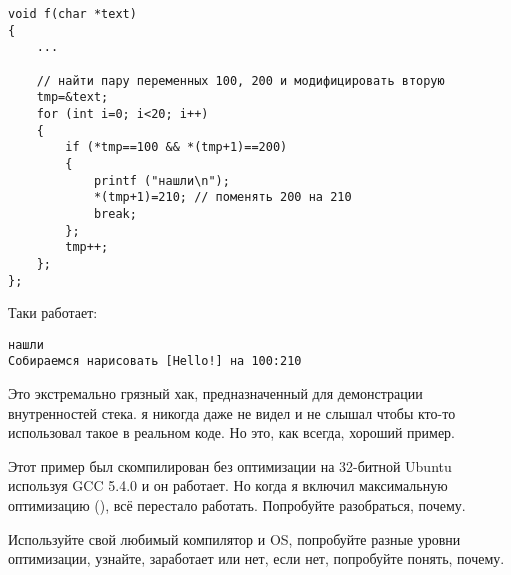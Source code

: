\begin{lstlisting}[style=customc]
void f(char *text)
{
	...

	// найти пару переменных 100, 200 и модифицировать вторую
	tmp=&text;
	for (int i=0; i<20; i++)
	{
		if (*tmp==100 && *(tmp+1)==200)
		{
			printf ("нашли\n");
			*(tmp+1)=210; // поменять 200 на 210
			break;
		};
		tmp++;
	};
};
\end{lstlisting}

Таки работает:

\begin{lstlisting}
нашли
Собираемся нарисовать [Hello!] на 100:210
\end{lstlisting}


Это экстремально грязный хак, предназначенный для демонстрации внутренностей стека.
я никогда даже не видел и не слышал чтобы кто-то использовал такое в реальном коде.
Но это, как всегда, хороший пример.

\myparagraph{\Exercise}

Этот пример был скомпилирован без оптимизации на 32-битной Ubuntu используя GCC 5.4.0 и он работает.
Но когда я включил максимальную оптимизацию (), всё перестало работать.
Попробуйте разобраться, почему.

Используйте свой любимый компилятор и OS, попробуйте разные уровни оптимизации, узнайте, заработает или нет,
если нет, попробуйте понять, почему.

